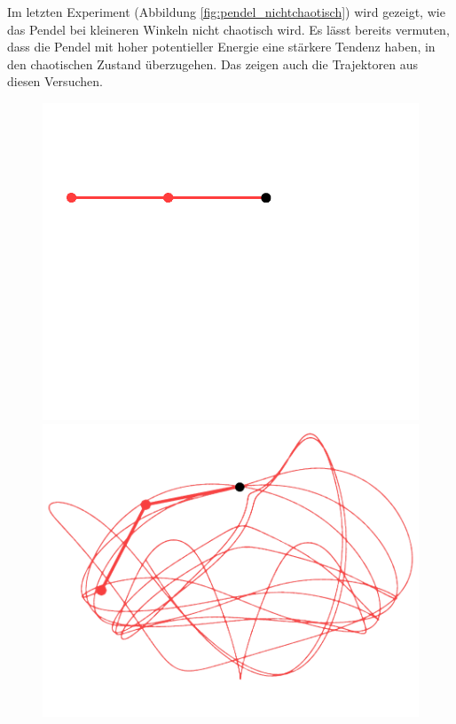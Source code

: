 Im letzten Experiment (Abbildung \ref{fig:pendel_nichtchaotisch}) wird gezeigt,
wie das Pendel bei kleineren Winkeln nicht chaotisch wird.
Es lässt bereits vermuten, dass die Pendel mit hoher potentieller Energie eine stärkere Tendenz haben,
in den chaotischen Zustand überzugehen.
Das zeigen auch die Trajektoren aus diesen Versuchen.
\begin{figure}
    \centering
    \begin{minipage}{0.45\textwidth}
        \centering
        \includegraphics[width=\textwidth]{papers/doppelpendel/images/pendel_stand_90.png}
    \end{minipage}
    \hfill
    \begin{minipage}{0.45\textwidth}
        \centering
        \includegraphics[width=\textwidth]{papers/doppelpendel/images/pendel_spur_90.png}

\end{minipage}
\end{figure}
